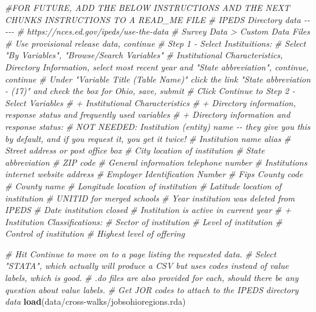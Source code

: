 \documentclass[
]{article}
\newenvironment{Shaded}{\begin{snugshade}}{\end{snugshade}}
\newcommand{\CommentTok}[1]{\textcolor[rgb]{0.56,0.35,0.01}{\textit{#1}}}
\newcommand{\FunctionTok}[1]{\textcolor[rgb]{0.13,0.29,0.53}{\textbf{#1}}}
\newcommand{\NormalTok}[1]{#1}
\newcommand{\StringTok}[1]{\textcolor[rgb]{0.31,0.60,0.02}{#1}}
\begin{document}
\begin{Shaded}
\begin{Highlighting}[]
\CommentTok{\#FOR FUTURE, ADD THE BELOW INSTRUCTIONS AND THE NEXT CHUNK\textquotesingle{}S INSTRUCTIONS TO A READ\_ME FILE}
\CommentTok{\# IPEDS Directory data {-}{-}{-}{-}{-}}
\CommentTok{\# https://nces.ed.gov/ipeds/use{-}the{-}data}
\CommentTok{\# Survey Data \textgreater{} Custom Data Files}
\CommentTok{\# Use provisional release data, continue}
\CommentTok{\# Step 1 {-} Select Instituitions:}
\CommentTok{\# Select "By Variables", "Browse/Search Variables"}
\CommentTok{\#  Institutional Characteristics, Directory Information, select most recent year and "State abbreviation", continue, continue}
\CommentTok{\#   Under "Variable Title (Table Name)" click the link "State abbreviation {-} (17)" and check the box for Ohio, save, submit}
\CommentTok{\# Click Continue to Step 2 {-} Select Variables}
\CommentTok{\# + Institutional Characteristics}
\CommentTok{\# + Directory information, response status and frequently used variables}
\CommentTok{\# + Directory information and response status:}
\CommentTok{\# NOT NEEDED: Institution (entity) name {-}{-} they give you this by default, and if you request it, you get it twice!}
\CommentTok{\# Institution name alias}
\CommentTok{\# Street address or post office box}
\CommentTok{\# City location of institution}
\CommentTok{\# State abbreviation}
\CommentTok{\# ZIP code}
\CommentTok{\# General information telephone number}
\CommentTok{\# Institution\textquotesingle{}s internet website address}
\CommentTok{\# Employer Identification Number}
\CommentTok{\# Fips County code}
\CommentTok{\# County name}
\CommentTok{\# Longitude location of institution}
\CommentTok{\# Latitude location of institution}
\CommentTok{\# UNITID for merged schools}
\CommentTok{\# Year institution was deleted from IPEDS}
\CommentTok{\# Date institution closed}
\CommentTok{\# Institution is active in current year}
\CommentTok{\# + Institution Classifications:}
\CommentTok{\# Sector of institution}
\CommentTok{\# Level of institution}
\CommentTok{\# Control of institution}
\CommentTok{\# Highest level of offering}


\CommentTok{\# Hit Continue to move on to a page listing the requested data.}
\CommentTok{\# Select "STATA", which actually will produce a CSV but uses codes instead of value labels, which is good.}
\CommentTok{\# .do files are also provided for each, should there be any question about value labels.}
\CommentTok{\# Get JOR codes to attach to the IPEDS directory data}
\FunctionTok{load}\NormalTok{(}\StringTok{\textquotesingle{}data/cross{-}walks/jobsohioregions.rda\textquotesingle{}}\NormalTok{)}


\end{Highlighting}
\end{Shaded}
\end{document}
